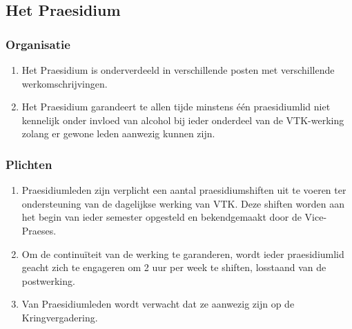\subsection{Het Praesidium}

    \subsubsection{Organisatie}\label{art:praesidium-organisatie}
    \begin{enumerate}
    \item Het Praesidium is onderverdeeld in verschillende posten met verschillende werkomschrijvingen.\label{par:praesidium-posten}
    \item Het Praesidium garandeert te allen tijde minstens één praesidiumlid niet kennelijk onder invloed van alcohol bij ieder onderdeel van de VTK-werking zolang er gewone leden aanwezig kunnen zijn.
    \end{enumerate}

    \subsubsection{Plichten}\label{art:plichten_praesidium}
    \begin{enumerate}
        \item Praesidiumleden zijn verplicht een aantal praesidiumshiften uit te voeren ter ondersteuning van de dagelijkse werking van VTK. Deze shiften worden aan het begin van ieder semester opgesteld en bekendgemaakt door de Vice-Praeses.
        \item Om de continuïteit van de werking te garanderen, wordt ieder praesidiumlid geacht zich te engageren om 2 uur per week te shiften, losstaand van de postwerking.
        \item Van Praesidiumleden wordt verwacht dat ze aanwezig zijn op de Kringvergadering.
    \end{enumerate}
    
